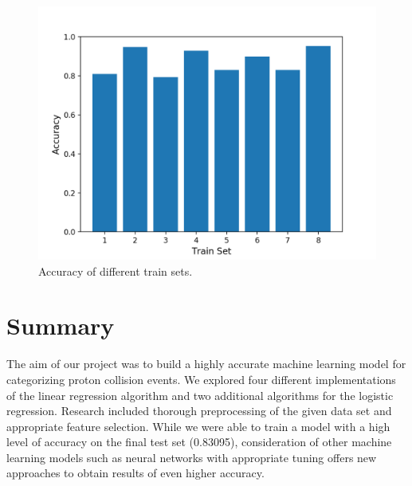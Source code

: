 \documentclass[10pt,conference,compsocconf]{IEEEtran}
\begin{document}
\begin{figure}[h]
  \centering
  \includegraphics[width=0.9\columnwidth]{train_set_accuracies}
  \caption{Accuracy of different train sets.}
  \vspace{-3mm}
\end{figure}

\section{Summary}

The aim of our project was to build a highly accurate machine learning model for categorizing proton collision events. We explored four different implementations of the linear regression algorithm and two additional algorithms for the logistic regression. Research included thorough preprocessing of the given data set and appropriate feature selection. While we were able to train a model with a high level of accuracy on the final test set (0.83095), consideration of other machine learning models such as neural networks with appropriate tuning offers new approaches to obtain results of even higher accuracy.
\end{document}

